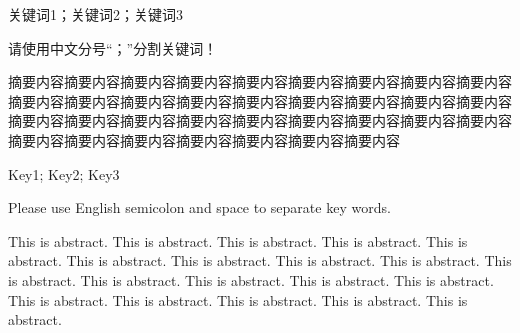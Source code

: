 {}

\begin{cnabstract}{关键词1；关键词2；关键词3}

  请使用中文分号“；”分割关键词！

  摘要内容摘要内容摘要内容摘要内容摘要内容摘要内容摘要内容摘要内容摘要内容摘要内容摘要内容摘要内容摘要内容摘要内容摘要内容摘要内容摘要内容摘要内容摘要内容摘要内容摘要内容摘要内容摘要内容摘要内容摘要内容摘要内容摘要内容摘要内容摘要内容摘要内容摘要内容摘要内容摘要内容摘要内容
\end{cnabstract}
\newpage

{}

\begin{enabstract}{Key1; Key2; Key3}

  Please use English semicolon and space to separate key words.

  This is abstract. This is abstract. This is abstract. This is abstract. This is abstract. This is abstract. This is abstract. This is abstract. This is abstract. This is abstract. This is abstract. This is abstract. This is abstract. This is abstract. This is abstract. This is abstract. This is abstract. This is abstract. This is abstract. 
\end{enabstract}
\newpage
